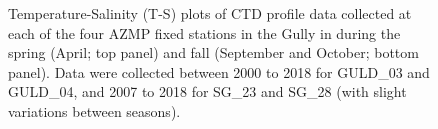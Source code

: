 \documentclass[12pt]{article}\usepackage[]{graphicx}\usepackage[]{color}
\begin{document}
\begin{landscapepage}
\begin{figure}[htb]

{\centering {} 

}

\caption{Temperature-Salinity (T-S) plots of CTD profile data collected at each of the four AZMP fixed stations in the Gully in during the spring (April; top panel) and fall (September and October; bottom panel). Data were collected between 2000 to 2018 for GULD\_03 and GULD\_04, and 2007 to 2018 for SG\_23 and SG\_28 (with slight variations between seasons).}\label{fig:figure9}
\end{figure}
\end{landscapepage}
\clearpage
\end{document}
